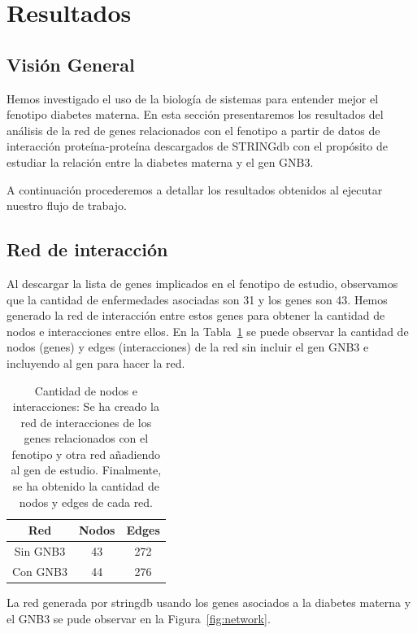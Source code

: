 
\section{Resultados}

\subsection{Visión General}

Hemos investigado el uso de la biología de sistemas para entender mejor el fenotipo diabetes materna. En esta sección presentaremos los resultados del análisis de la red de genes relacionados con el fenotipo a partir de datos de interacción proteína-proteína descargados de STRINGdb con el propósito de estudiar la relación entre la diabetes materna y el gen GNB3.

A continuación procederemos a detallar los resultados obtenidos al ejecutar nuestro flujo de trabajo.

\subsection{Red de interacción}

Al descargar la lista de genes implicados en el fenotipo de estudio, observamos que la cantidad de enfermedades asociadas son 31 y los genes son 43. Hemos generado la red de interacción entre estos genes para obtener la cantidad de nodos e interacciones entre ellos. En la Tabla~\ref{table:nodes_edges_count} se puede observar la cantidad de nodos (genes) y edges (interacciones) de la red sin incluir el gen GNB3 e incluyendo al gen para hacer la red.


\begin{table}[h]
	\centering
	\begin{tabular}{|c|c|c|}
		\hline
		Red & Nodos & Edges \\ \hline
		Sin GNB3 & 43    & 272   \\ \hline
		Con GNB3 & 44    & 276  \\ \hline
	\end{tabular}
	\caption{Cantidad de nodos e interacciones: Se ha creado la red de interacciones de los genes relacionados con el fenotipo y otra red añadiendo al gen de estudio. Finalmente, se ha obtenido la cantidad de nodos y edges de cada red.}
	\label{table:nodes_edges_count}
\end{table}

La red generada por stringdb usando los genes asociados a la diabetes materna y el GNB3 se pude observar en la Figura~\ref{fig:network}.


